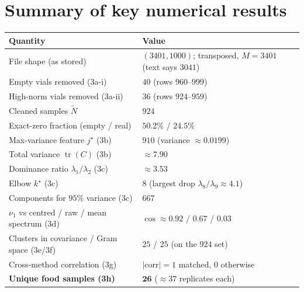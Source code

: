 \documentclass[11pt]{article}
\DeclareMathOperator{\tr}{tr}
\newcommand{\Nt}{\widetilde{N}}
\theoremstyle{definition}\newtheorem{definition}{Definition}[section]
\theoremstyle{plain}\newtheorem{proposition}{Proposition}[section]
\theoremstyle{remark}\newtheorem{remark}{Remark}[section]
\begin{document}
\section{Summary of key numerical results}\label{app:numbers}
\begin{center}\small
\begin{tabular}{ll}
\toprule
Quantity & Value \\
\midrule
File shape (as stored) & $(3401,1000)$; transposed, $M=3401$ (text says $3041$) \\
Empty vials removed (3a-i) & $40$ (rows $960$--$999$) \\
High-norm vials removed (3a-ii) & $36$ (rows $924$--$959$) \\
Cleaned samples $\Nt$ & $924$ \\
Exact-zero fraction (empty / real) & $50.2\%$ / $24.5\%$ \\
Max-variance feature $j^\star$ (3b) & $910$ (variance $\approx0.0199$) \\
Total variance $\tr(C)$ (3b) & $\approx7.90$ \\
Dominance ratio $\lambda_1/\lambda_2$ (3c) & $\approx3.53$ \\
Elbow $k^\star$ (3c) & $8$ (largest drop $\lambda_8/\lambda_9\approx4.1$) \\
Components for $95\%$ variance (3c) & $667$ \\
$\nu_1$ vs centred / raw / mean spectrum (3d) & $\cos\approx0.92$ / $0.67$ / $0.03$ \\
Clusters in covariance / Gram space (3e/3f) & $25$ / $25$ (on the $924$ set) \\
Cross-method correlation (3g) & $|\mathrm{corr}|=1$ matched, $0$ otherwise \\
\textbf{Unique food samples (3h)} & $\mathbf{26}$ ($\approx37$ replicates each) \\
\bottomrule
\end{tabular}
\end{center}
\end{document}
